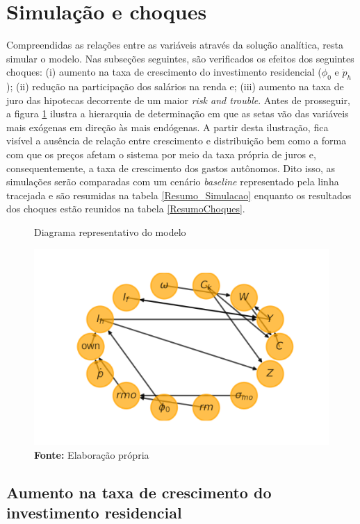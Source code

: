 \section{Simulação e choques}
\label{SecChoques}

Compreendidas as relações entre as variáveis através da solução analítica, resta simular o modelo. Nas subseções seguintes, são verificados os efeitos dos seguintes choques:
(i) aumento na taxa de crescimento do investimento residencial ($\phi_0$ e $\dot p_h$); (ii) redução na participação dos salários na renda e;  (iii) aumento na taxa de juro das hipotecas decorrente de um maior \textit{risk and trouble}. Antes de prosseguir, a figura \ref{DAG} ilustra a hierarquia de determinação em que as setas vão das variáveis mais exógenas em direção às mais endógenas. A partir desta ilustração, fica visível a ausência de relação entre crescimento e distribuição bem como a forma com que os preços afetam o sistema por meio da taxa própria de juros e, consequentemente, a taxa de crescimento dos gastos autônomos. Dito isso, as simulações serão comparadas com um cenário \textit{baseline} representado pela linha tracejada e são resumidas na tabela \ref{Resumo_Simulacao} enquanto os resultados dos choques estão reunidos na tabela \ref{ResumoChoques}.

\begin{figure}[H]
	\centering
	\label{DAG}
	\caption{Diagrama representativo do modelo}
	\includegraphics[width=\textwidth]{../../Modelo/Versoes/Dag.png}
	\caption*{\textbf{Fonte:} Elaboração própria}
\end{figure}



\subsection*{Aumento na taxa de crescimento do investimento residencial}

